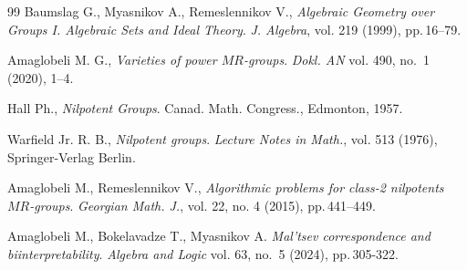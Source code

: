 \documentclass[11pt]{article}
\theoremstyle{definition}
\begin{document}
\begin{thebibliography}{99}
	Baumslag G., Myasnikov A., Remeslennikov V.,
{\it Algebraic Geometry over Groups I. Algebraic Sets and Ideal Theory}. \emph{J. Algebra}, vol. 219 (1999), pp.\,16--79.

Amaglobeli M. G., {\it Varieties of power $M\!R$-groups}. \emph{Dokl. AN} vol. 490, no.~1 (2020), 1--4.

Hall Ph., \textit{Nilpotent Groups}. Canad. Math. Congress., Edmonton, 1957.

Warfield Jr. R. B., {\it Nilpotent groups}. \emph{Lecture Notes in Math.}, vol. 513 (1976), Springer-Verlag Berlin.

Amaglobeli M., Remeslennikov V., {\it Algorithmic problems for class-2 nil\-po\-tents $M\!R$-groups}. \emph{Georgian Math. J.}, vol. 22, no. 4 (2015), pp.\,441--449.

 Amaglobeli M., Bokelavadze T., Myasnikov A. \textit{Mal'tsev correspondence and biinterpretability}. \emph{Algebra and Logic} vol. 63, no.~5 (2024), pp.\,305-322.








\end{thebibliography}
\end{document}
